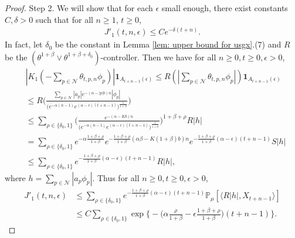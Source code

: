 \documentclass[12pt,a4paper]{amsart}
\theoremstyle{plain}
\theoremstyle{definition}
\numberwithin{equation}{section}
\begin{document}
\begin{proof}
    Step 2.  
    We will show that for each $\epsilon$ small enough, there exist constants $C,\delta>0$ such that for all $n\geq 1, \, t\geq 0$, 
\begin{align}\label{eq:large rate J1}
    J'_1(t,n,\epsilon)\leq C e^{-\delta(t+n)}. %
\end{align}
	In fact, let $\delta_0$ be the constant in Lemma \ref{lem: upper bound for usgx}.(7) and $R$ be the $(\theta^{1+\beta}\vee \theta^{1+\beta+\delta_0})$-controller. Then we have
	for all $n\geq 0, t\geq 0, \epsilon > 0$, 
\begin{align}
    & |K_1(-\sum_{p\in \mathcal{N}}\theta_{t,p,n}\phi_p)|\mathbf{1}_{A_{t+n-1}(\epsilon)}
    \leq R(|\sum_{p\in\mathcal{N}}\theta_{t,p,n}\phi_p|)\mathbf{1}_{A_{t+n-1}(\epsilon)}
    \\&\leq R \Big(\frac{\sum_{p\in\mathcal{N}}|a_p|e^{-(\alpha-|p|b)n}|\phi_p|}{\big(e^{-\alpha(n-1)}e^{(\alpha-\epsilon)(t+n-1)}\big)^{\frac{1}{1+\beta}}}\Big)
    \\&\leq \sum_{\rho\in\{\delta_0,1\}}\Big(\frac{e^{-(\alpha-Kb)n}}{\big(e^{-\alpha(n-1)}e^{(\alpha-\epsilon)(t+n-1)}\big)^{\frac{1}{1+\beta}}}\Big)^{1+\beta+\rho}R|h|
    \\&=\sum_{\rho\in\{\delta_0,1\}}e^{-\alpha\frac{1+\beta+\rho}{1+\beta}}e^{-\frac{1+\beta+\rho}{1+\beta}(\alpha\beta-K(1+\beta)b)n}e^{-\frac{1+\beta+\rho}{1+\beta}(\alpha-\epsilon)(t+n-1)}S|h|
    \\&\leq \sum_{\rho\in\{\delta_0,1\}}e^{-\frac{1+\beta+\rho}{1+\beta}(\alpha-\epsilon)(t+n-1)}R|h|,
\end{align}
    where $h=\sum_{p\in \mathcal{N}}|a_p\phi_p|$.
    Thus for all $n\geq 0,  t\geq 0, \epsilon > 0$,
\begin{align}
\label{eq: estimate of J11}
     J'_1(t,n,\epsilon)&
     \leq  \sum_{\rho\in\{\delta_0,1\}}e^{-\frac{1+\beta+\rho}{1+\beta}(\alpha-\epsilon)(t+n-1)}\mathbb{P}_{\mu}[\langle R|h|,X_{t+n-1}\rangle]\\
     & \leq C\sum_{\rho\in\{\delta_0,1\}}\exp\Big\{-\Big(\alpha\frac{\rho}{1+\beta}-\epsilon\frac{1+\beta+\rho}{1+\beta}\Big)(t+n-1)\Big\}.
\end{align}


\end{proof}
\end{document}
